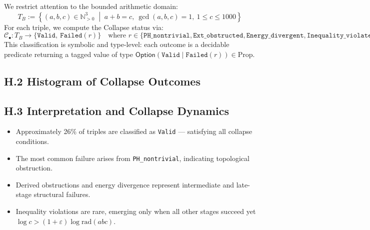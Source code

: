 \documentclass[11pt]{article}
\begin{document}
We restrict attention to the bounded arithmetic domain:
\[
T_B := \left\{ (a,b,c) \in \mathbb{N}_{>0}^3 \;\middle|\; a + b = c,\ \gcd(a,b,c)=1,\ 1 \leq c \leq 1000 \right\}
\]
For each triple, we compute the Collapse status via:
\[
\mathcal{C}_\bullet : T_B \longrightarrow \{ \texttt{Valid},\ \texttt{Failed}(r) \}
\quad \text{where } r \in \{\texttt{PH\_nontrivial}, \texttt{Ext\_obstructed}, \texttt{Energy\_divergent}, \texttt{Inequality\_violated}\}
\]
This classification is symbolic and type-level: each outcome is a decidable predicate  
returning a tagged value of type \( \mathsf{Option}(\texttt{Valid} \;|\; \texttt{Failed}(r)) \in \mathrm{Prop} \).

\subsection*{H.2 Histogram of Collapse Outcomes}

\begin{center}
\end{center}

\subsection*{H.3 Interpretation and Collapse Dynamics}

\begin{itemize}
  \item Approximately 26\% of triples are classified as \texttt{Valid} — satisfying all collapse conditions.
  \item The most common failure arises from \texttt{PH\_nontrivial}, indicating topological obstruction.
  \item Derived obstructions and energy divergence represent intermediate and late-stage structural failures.
  \item Inequality violations are rare, emerging only when all other stages succeed yet \( \log c > (1+\varepsilon)\log \mathrm{rad}(abc) \).
\end{itemize}
\end{document}

